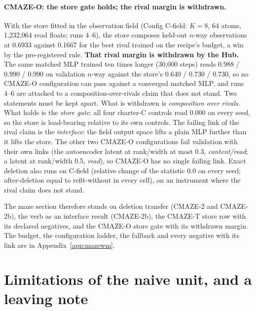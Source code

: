 \documentclass{article} %
\begin{document}
\paragraph{CMAZE-O: the store gate holds; the rival margin is withdrawn.} With the store fitted in
the observation field (Config C-field: $K=8$, 64 atoms, 1,232,064 read floats; runs 4--6), the store
composes held-out $n$-way observations at 0.6933 against 0.1667 for the best rival trained on the
recipe's budget, a win by the pre-registered rule. \textbf{That rival margin is withdrawn by the
Hub.} The same matched MLP trained ten times longer (30,000 steps) reads 0.988 / 0.990 / 0.990 on
validation $n$-way against the store's 0.640 / 0.730 / 0.730, so no CMAZE-O configuration can pass
against a converged matched MLP, and runs 4--6 are attached to a composition-over-rivals claim that
does not stand. Two statements must be kept apart. What is withdrawn is \emph{composition over
rivals}. What holds is the \emph{store gate}: all four charter-C controls read 0.000 on every seed,
so the store is load-bearing relative to its own controls. The failing link of the rival claim is
the \emph{interface}: the field output space lifts a plain MLP further than it lifts the store. The
other two CMAZE-O configurations fail validation with their own links (the autoencoder latent at
rank/width at most 0.3, \emph{content/read}; a latent at rank/width 0.5, \emph{read}), so CMAZE-O has
no single failing link. Exact deletion also runs on C-field (relative change of the statistic 0.0 on
every seed; after-deletion equal to refit-without in every cell), on an instrument where the rival
claim does not stand.

The maze section therefore stands on deletion transfer (CMAZE-2 and CMAZE-2b), the verb as an
interface result (CMAZE-2b), the CMAZE-T store row with its declared negatives, and the CMAZE-O store
gate with its withdrawn margin. The budget, the configuration ladder, the fallback and every negative
with its link are in Appendix~\ref{app:mazewm}.

\section{Limitations of the naive unit, and a leaving note}
\label{sec:limits}
\end{document}
